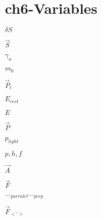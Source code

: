 \section{ch6-Variables}

\noindent $\delta S$ \newline

\noindent $\vec{S}$ \newline

\noindent $\gamma_u$ \newline

\noindent $m_0$ \newline

\noindent $\vec{P}_t$ \newline

\noindent $E_{rest}$ \newline

\noindent $E$ \newline

\noindent $\vec{P}$ \newline

\noindent $p_{light}$ \newline

\noindent $p, h, f$ \newline

\noindent $\vec{A}$ \newline

\noindent $\vec{F}$ \newline

\noindent $..._{parralel} ..._{perp}$ \newline

\noindent $\vec{F}_{<'>}$ \newline
